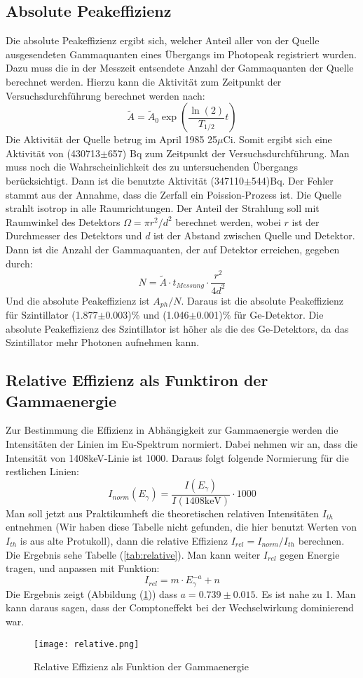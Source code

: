 \documentclass[ngerman,11pt]{article}
\begin{document}
\begin{multicols}{2}
	\subsection{Absolute Peakeffizienz}
	Die absolute Peakeffizienz ergibt sich, welcher Anteil aller von der Quelle ausgesendeten Gammaquanten eines \"Ubergangs im Photopeak registriert wurden. Dazu muss die in der Messzeit entsendete Anzahl der Gammaquanten der Quelle berechnet werden. Hierzu kann die Aktivit\"at zum Zeitpunkt der Versuchsdurchf\"uhrung berechnet werden nach:
	$$ \tilde{A} = \tilde{A}_0\exp\left( \frac{\ln(2)}{T_{1/2}}t \right) $$
	Die Aktivit\"at der Quelle betrug im April 1985 25$\mu$Ci. Somit ergibt sich eine Aktivit\"at von (430713$\pm$657) Bq zum Zeitpunkt der Versuchsdurchf\"uhrung. Man muss noch die Wahrscheinlichkeit des zu untersuchenden \"Ubergangs ber\"ucksichtigt. Dann ist die benutzte Aktivit\"at (347110$\pm$544)Bq. Der Fehler stammt aus der Annahme, dass die Zerfall ein Poission-Prozess ist. Die Quelle strahlt isotrop in alle Raumrichtungen. Der Anteil der Strahlung soll mit Raumwinkel des Detektors $\Omega = \pi r^2/d^2$ berechnet werden, wobei $r$ ist der Durchmesser des Detektors und $d$ ist der Abstand zwischen Quelle und Detektor. Dann ist die Anzahl der Gammaquanten, der auf Detektor erreichen, gegeben durch:
	$$ N = \tilde{A}\cdot t_{Messung}\cdot\frac{r^2}{4d^2} $$
	Und die absolute Peakeffizienz ist $A_{ph}/N$. Daraus ist die absolute Peakeffizienz f\"ur Szintillator (1.877$\pm$0.003)\% und (1.046$\pm$0.001)\% f\"ur Ge-Detektor. Die absolute Peakeffizienz des Szintillator ist h\"oher als die des Ge-Detektors, da das Szintillator mehr Photonen aufnehmen kann.
	\subsection{Relative Effizienz als  Funktiron der Gammaenergie}
	Zur Bestimmung die Effizienz in Abh\"angigkeit zur Gammaenergie werden die Intensit\"aten der Linien im Eu-Spektrum normiert. Dabei nehmen wir an, dass die Intensit\"at von 1408keV-Linie ist 1000. Daraus folgt folgende Normierung f\"ur die restlichen Linien:
	$$ I_{norm}(E_\gamma)=\frac{I(E_\gamma)}{I(1408\mathrm{keV})}\cdot 1000 $$
	Man soll jetzt aus Praktikumheft die theoretischen relativen Intensit\"aten $I_{th}$ entnehmen (Wir haben diese Tabelle nicht gefunden, die hier benutzt Werten von $I_{th}$ is aus alte Protukoll), dann die relative Effizienz $I_{rel} = I_{norm}/I_{th}$ berechnen. Die Ergebnis sehe Tabelle (\ref{tab:relative}). Man kann weiter $I_{rel}$ gegen Energie tragen, und anpassen mit Funktion:
	$$ I_{rel} = m\cdot E_\gamma^{-a} + n $$
	Die Ergebnis zeigt (Abbildung (\ref{fig:relative})) dass $a=0.739\pm0.015$. Es ist nahe zu 1. Man kann daraus sagen, dass der Comptoneffekt bei der Wechselwirkung dominierend war.
	\begin{figure}[H]
		\centering
		\texttt{[image: relative.png]}
		\caption{Relative Effizienz als Funktion der Gammaenergie}
		\label{fig:relative}
	\end{figure}
	

\end{multicols}
\end{document}
